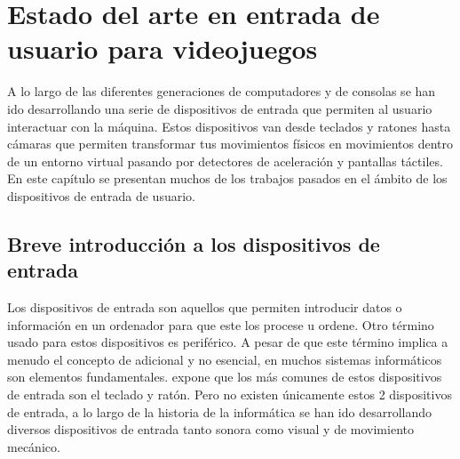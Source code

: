 %
%
%
%
%
%
%
%
%
%

\chapter{Estado del arte en entrada de usuario para videojuegos}
\label{cap2}


A lo largo de las diferentes generaciones de computadores y de consolas se han ido desarrollando una serie de dispositivos de entrada que permiten al usuario interactuar con la m\'aquina. Estos dispositivos van desde teclados y ratones hasta c\'amaras que permiten transformar tus movimientos f\'isicos en movimientos dentro de un entorno virtual pasando por detectores de aceleraci\'on y pantallas t\'actiles. En este cap\'itulo se presentan muchos de los trabajos pasados en el \'ambito de los dispositivos de entrada de usuario.
\section{Breve introducci\'on a los dispositivos de entrada}

Los dispositivos de entrada son aquellos que permiten introducir datos o informaci\'on en un ordenador para que este los procese u ordene. Otro t\'ermino usado para estos dispositivos es perif\'erico. A pesar de que este t\'ermino implica a menudo el concepto de adicional y no esencial, en muchos sistemas inform\'aticos son elementos fundamentales. \cite{entradasalida} expone que los m\'as comunes de estos dispositivos de entrada son el teclado y rat\'on. Pero no existen \'unicamente estos 2 dispositivos de entrada, a lo largo de la historia de la inform\'atica se han ido desarrollando diversos dispositivos de entrada tanto sonora como visual y de movimiento mec\'anico.\\


